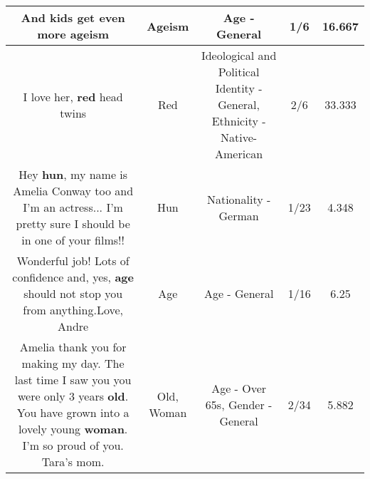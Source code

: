 \documentclass[11pt]{article}
\newlength\mylength
\begin{document}
\begin{center}
\begin{longtable}{|C{.65\mylength}|C{.30\mylength}|C{.12\mylength}|C{.12\mylength}|C{.12\mylength}|}
  \small And kids get even more ageism\normalsize   & Ageism & Age - General & 1/6 & 16.667 \\  \hline
  \small I love her,  \textbf{r\textbf{ed}} head twins\normalsize   & Red &  Ideological and Political Identity - General, Ethnicity - Native-American & 2/6 & 33.333 \\  \hline
  \small Hey \textbf{hun}, my name is Amelia Conway too and I'm an actress... I'm pretty sure I should be in one of your films!!\normalsize   & Hun & Nationality - German & 1/23 & 4.348 \\  \hline
  \small Wonderful job!  Lots of confidence and, yes, \textbf{age} should not stop you from anything.Love, Andre\normalsize   & Age & Age - General & 1/16 & 6.25 \\  \hline
  \small Amelia thank you for making my day. The last time I saw you you were only 3 years \textbf{old}. You have grown into a lovely young \textbf{woman}. I'm so proud of you. Tara's mom.\normalsize   & Old, Woman & Age - Over 65s, Gender - General & 2/34 & 5.882 \\  \hline
  
\end{longtable}
\end{center}
\end{document}
